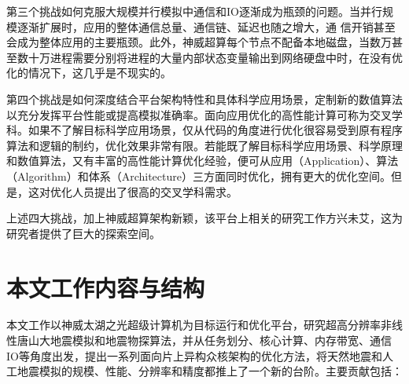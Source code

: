第三个挑战如何克服大规模并行模拟中通信和IO逐渐成为瓶颈的问题。当并行规模逐渐扩展时，应用的整体通信总量、通信链、延迟也随之增大，通 信开销甚至会成为整体应用的主要瓶颈。此外，神威超算每个节点不配备本地磁盘，当数万甚至数十万进程需要分别将进程的大量内部状态变量输出到网络硬盘中时，在没有优化的情况下，这几乎是不现实的。

第四个挑战是如何深度结合平台架构特性和具体科学应用场景，定制新的数值算法以充分发挥平台性能或提高模拟准确率。面向应用优化的高性能计算可称为交叉学科。如果不了解目标科学应用场景，仅从代码的角度进行优化很容易受到原有程序算法和逻辑的制约，优化效果非常有限。若能既了解目标科学应用场景、科学原理和数值算法，又有丰富的高性能计算优化经验，便可从应用（Application）、算法（Algorithm）和体系（Architecture）三方面同时优化，拥有更大的优化空间。但是，这对优化人员提出了很高的交叉学科需求。

上述四大挑战，加上神威超算架构新颖，该平台上相关的研究工作方兴未艾，这为研究者提供了巨大的探索空间。

\section{本文工作内容与结构}

本文工作以神威太湖之光超级计算机为目标运行和优化平台，研究超高分辨率非线性唐山大地震模拟和地震物探算法，并从任务划分、核心计算、内存带宽、通信IO等角度出发，提出一系列面向片上异构众核架构的优化方法，将天然地震和人工地震模拟的规模、性能、分辨率和精度都推上了一个新的台阶。主要贡献包括：


